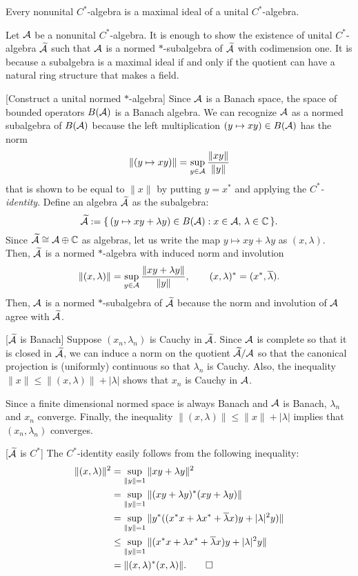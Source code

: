 \documentclass{../exp}
\begin{document}
\begin{thm}
Every nonunital $C^*$-algebra is a maximal ideal of a unital $C^*$-algebra.
\end{thm}
\begin{pf}
Let $\mathcal{A}$ be a nonunital $C^*$-algebra.
It is enough to show the existence of unital $C^*$-algebra $\widetilde{\mathcal{A}}$ such that $\mathcal{A}$ is a normed $*$-subalgebra of $\widetilde{\mathcal{A}}$ with codimension one.
It is because a subalgebra is a maximal ideal if and only if the quotient can have a natural ring structure that makes a field.

[Construct a unital normed $*$-algebra]
Since $\mathcal{A}$ is a Banach space, the space of bounded operators $B(\mathcal{A})$ is a Banach algebra.
We can recognize $\mathcal{A}$ as a normed subalgebra of $B(\mathcal{A})$ because the left multiplication $(y\mapsto xy)\in B(\mathcal{A})$ has the norm
\[\|(y\mapsto xy)\|=\sup_{y\in\mathcal{A}}\frac{\|xy\|}{\|y\|}\]
that is shown to be equal to $\|x\|$ by putting $y=x^*$ and applying the \emph{$C^*$-identity}.
Define an algebra $\widetilde{\mathcal{A}}$ as the subalgebra:
\[\widetilde{\mathcal{A}}:=\{\,(y\mapsto xy+\lambda y)\in B(\mathcal{A}):x\in\mathcal{A},\,\lambda\in\mathbb{C}\,\}.\]
Since $\widetilde{\mathcal{A}}\cong\mathcal{A}\oplus\mathbb{C}$ as algebras, let us write the map $y\mapsto xy+\lambda y$ as $(x,\lambda)$.
Then, $\widetilde{\mathcal{A}}$ is a normed $*$-algebra with induced norm and involution
\[\|(x,\lambda)\|=\sup_{y\in\mathcal{A}}\frac{\|xy+\lambda y\|}{\|y\|},\qquad(x,\lambda)^*=(x^*,\overline{\lambda}).\]
Then, $\mathcal{A}$ is a normed $*$-subalgebra of $\widetilde{\mathcal{A}}$ because the norm and involution of $\mathcal{A}$ agree with $\widetilde{\mathcal{A}}$.

[$\widetilde{\mathcal{A}}$ is Banach]
Suppose $(x_n,\lambda_n)$ is Cauchy in $\widetilde{\mathcal{A}}$.
Since $\mathcal{A}$ is complete so that it is closed in $\widetilde{\mathcal{A}}$, we can induce a norm on the quotient $\widetilde{\mathcal{A}}/\mathcal{A}$ so that the canonical projection is (uniformly) continuous so that $\lambda_n$ is Cauchy.
Also, the inequality $\|x\|\le\|(x,\lambda)\|+|\lambda|$ shows that $x_n$ is Cauchy in $\mathcal{A}$.

Since a finite dimensional normed space is always Banach and $\mathcal{A}$ is Banach, $\lambda_n$ and $x_n$ converge.
Finally, the inequality $\|(x,\lambda)\|\le\|x\|+|\lambda|$ implies that $(x_n,\lambda_n)$ converges.

[$\widetilde{\mathcal{A}}$ is $C^*$]
The $C^*$-identity easily follows from the following inequality:
\begin{align*}
\|(x,\lambda)\|^2&=\sup_{\|y\|=1}\|xy+\lambda y\|^2\\
&=\sup_{\|y\|=1}\|(xy+\lambda y)^*(xy+\lambda y)\|\\
&=\sup_{\|y\|=1}\|y^*((x^*x+\lambda x^*+\overline\lambda x)y+|\lambda|^2y)\|\\
&\le\sup_{\|y\|=1}\|(x^*x+\lambda x^*+\overline\lambda x)y+|\lambda|^2y\|\\
&=\|(x,\lambda)^*(x,\lambda)\|.\qedhere
\end{align*}
\end{pf}
\end{document}
